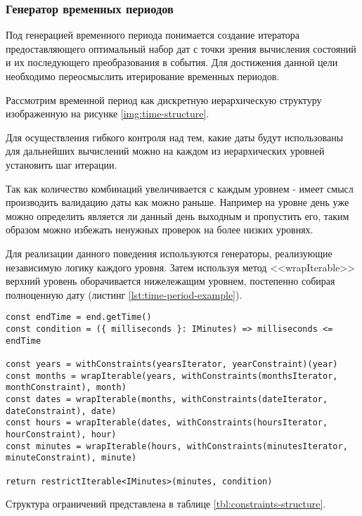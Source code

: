 \subsubsection{Генератор временных периодов}

Под генерацией временного периода понимается создание итератора предоставляющего оптимальный набор дат с точки зрения вычисления состояний и их последующего преобразования в события.
Для достижения данной цели необходимо переосмыслить итерирование временных периодов.

Рассмотрим временной период как дискретную иерархическую структуру изображенную на рисунке \ref{img:time-structure}.


Для осуществления гибкого контроля над тем, какие даты будут использованы для дальнейших вычислений можно на каждом из иерархических уровней установить шаг итерации.

Так как количество комбинаций увеличивается с каждым уровнем - имеет смысл производить валидацию даты как можно раньше.
Например на уровне день уже можно определить является ли данный день выходным и пропустить его, таким образом можно избежать ненужных проверок на более низких уровнях.

Для реализации данного поведения используются генераторы, реализующие независимую логику каждого уровня.
Затем используя метод <<wrapIterable>> верхний уровень оборачивается нижележащим уровнем, постепенно собирая полноценную дату (листинг \ref{lst:time-period-example}).

\begin{lstlisting}[caption={Процесс составления временного периода},label={lst:time-period-example}]
const endTime = end.getTime()
const condition = ({ milliseconds }: IMinutes) => milliseconds <= endTime

const years = withConstraints(yearsIterator, yearConstraint)(year)
const months = wrapIterable(years, withConstraints(monthsIterator, monthConstraint), month)
const dates = wrapIterable(months, withConstraints(dateIterator, dateConstraint), date)
const hours = wrapIterable(dates, withConstraints(hoursIterator, hourConstraint), hour)
const minutes = wrapIterable(hours, withConstraints(minutesIterator, minuteConstraint), minute)

return restrictIterable<IMinutes>(minutes, condition)
\end{lstlisting}

Структура ограничений представлена в таблице \ref{tbl:constraints-structure}.

